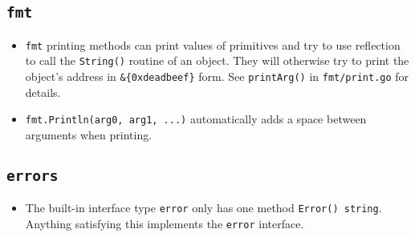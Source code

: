 \documentclass[12pt]{article}
\begin{document}
\subsection{\texttt{fmt}}
\begin{itemize}
    \item \texttt{fmt} printing methods can print values of primitives
        and try to use reflection to call the \texttt{String()} routine
        of an object. They will otherwise try to print the object's address
        in \texttt{\&\{0xdeadbeef\}} form. See \texttt{printArg()} in
        \texttt{fmt/print.go} for details.
    \item \texttt{fmt.Println(arg0, arg1, ...)} automatically adds a
        space between arguments when printing.
\end{itemize}

\subsection{\texttt{errors}}
\begin{itemize}
    \item The built-in interface type \texttt{error} only has one method
        \texttt{Error() string}. Anything satisfying this implements the
        \texttt{error} interface.
\end{itemize}

\clearpage

\nocite{*}

\end{document}
